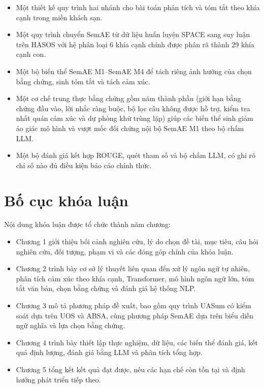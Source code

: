 \begin{itemize}[leftmargin=1.2cm]
    \item Một thiết kế quy trình hai nhánh cho bài toán phân tích và tóm tắt theo khía cạnh trong miền khách sạn.
    \item Một quy trình chuyển SemAE từ dữ liệu huấn luyện SPACE sang suy luận trên HASOS với hệ phân loại 6 khía cạnh chính được phân rã thành 29 khía cạnh con.
    \item Một bộ biến thể SemAE M1--SemAE M4 để tách riêng ảnh hưởng của chọn bằng chứng, sinh tóm tắt và tách cảm xúc.
    \item Một cơ chế trung thực bằng chứng gồm năm thành phần (giới hạn bằng chứng đầu vào, lời nhắc ràng buộc, bộ lọc câu không được hỗ trợ, kiểm tra nhất quán cảm xúc và dự phòng khử trùng lặp) giúp các biến thể sinh giảm ảo giác mô hình và vượt mốc đối chứng nội bộ SemAE M1 theo bộ chấm LLM.
    \item Một bộ đánh giá kết hợp ROUGE, quét tham số và bộ chấm LLM, có ghi rõ chỉ số nào đủ điều kiện báo cáo chính thức.
\end{itemize}

\section{Bố cục khóa luận}

Nội dung khóa luận được tổ chức thành năm chương:

\begin{itemize}[leftmargin=1.2cm]
    \item Chương 1 giới thiệu bối cảnh nghiên cứu, lý do chọn đề tài, mục tiêu, câu hỏi nghiên cứu, đối tượng, phạm vi và các đóng góp chính của khóa luận.
    \item Chương 2 trình bày cơ sở lý thuyết liên quan đến xử lý ngôn ngữ tự nhiên, phân tích cảm xúc theo khía cạnh, Transformer, mô hình ngôn ngữ lớn, tóm tắt văn bản, chọn bằng chứng và đánh giá hệ thống NLP.
    \item Chương 3 mô tả phương pháp đề xuất, bao gồm quy trình UASum có kiểm soát dựa trên UOS và ABSA, cùng phương pháp SemAE dựa trên biểu diễn ngữ nghĩa và lựa chọn bằng chứng.
    \item Chương 4 trình bày thiết lập thực nghiệm, dữ liệu, các biến thể đánh giá, kết quả định lượng, đánh giá bằng LLM và phân tích tổng hợp.
    \item Chương 5 tổng kết kết quả đạt được, nêu các hạn chế còn tồn tại và định hướng phát triển tiếp theo.
\end{itemize}
